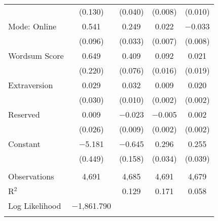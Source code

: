 \begin{table}[!htbp]
\begin{tabular}{@{\extracolsep{0pt}}lcccc}
  & (0.130) & (0.040) & (0.008) & (0.010) \\ 
  Mode: Online & 0.541 & 0.249 & 0.022 & $-$0.033 \\ 
  & (0.096) & (0.033) & (0.007) & (0.008) \\ 
  Wordsum Score & 0.649 & 0.409 & 0.092 & 0.021 \\ 
  & (0.220) & (0.076) & (0.016) & (0.019) \\ 
  Extraversion & 0.029 & 0.032 & 0.009 & 0.020 \\ 
  & (0.030) & (0.010) & (0.002) & (0.002) \\ 
  Reserved & 0.009 & $-$0.023 & $-$0.005 & 0.002 \\ 
  & (0.026) & (0.009) & (0.002) & (0.002) \\ 
  Constant & $-$5.181 & $-$0.645 & 0.296 & 0.255 \\ 
  & (0.449) & (0.158) & (0.034) & (0.039) \\ 
 \hline \\[-1.8ex] 
Observations & 4,691 & 4,685 & 4,691 & 4,679 \\ 
R$^{2}$ &  & 0.129 & 0.171 & 0.058 \\ 
Log Likelihood & $-$1,861.790 &  &  &  \\ 
\hline 
\hline \\[-1.8ex] 
\end{tabular} 
\end{table} 
